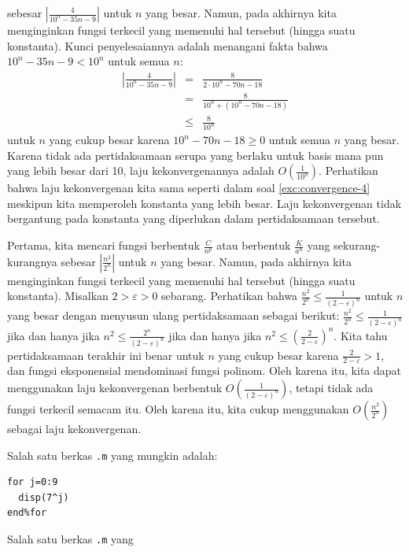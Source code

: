 \begin{description}
sebesar $\left|\frac{4}{10^{n}-35n-9}\right|$ untuk $n$ yang besar.
Namun, pada akhirnya kita menginginkan fungsi terkecil yang memenuhi
hal tersebut (hingga suatu konstanta). Kunci penyelesaiannya adalah
menangani fakta bahwa $10^{n}-35n-9<10^{n}$ untuk semua $n$:
\begin{eqnarray*}
\left|\frac{4}{10^{n}-35n-9}\right| & = & \frac{8}{2\cdot10^{n}-70n-18}\\
 & = & \frac{8}{10^{n}+(10^{n}-70n-18)}\\
 & \leq & \frac{8}{10^{n}}
\end{eqnarray*}
untuk $n$ yang cukup besar karena $10^{n}-70n-18\geq0$ untuk semua
$n$ yang besar. Karena tidak ada pertidaksamaan serupa yang berlaku
untuk basis mana pun yang lebih besar dari 10, laju kekonvergenannya
adalah $O\left(\frac{1}{10^{n}}\right)$. Perhatikan bahwa laju kekonvergenan
kita sama seperti dalam soal \ref{exc:convergence-4} meskipun kita
memperoleh konstanta yang lebih besar. Laju kekonvergenan tidak bergantung
pada konstanta yang diperlukan dalam pertidaksamaan tersebut.
\item [{\ref{exc:convergence-8}:}] Pertama, kita mencari fungsi berbentuk
$\frac{C}{n^{p}}$ atau berbentuk $\frac{K}{a^{n}}$ yang sekurang-kurangnya
sebesar $\left|\frac{n^{2}}{2^{n}}\right|$ untuk $n$ yang besar.
Namun, pada akhirnya kita menginginkan fungsi terkecil yang memenuhi
hal tersebut (hingga suatu konstanta). Misalkan $2>\varepsilon>0$
sebarang. Perhatikan bahwa $\frac{n^{2}}{2^{n}}\leq\frac{1}{(2-\varepsilon)^{n}}$
untuk $n$ yang besar dengan menyusun ulang pertidaksamaan sebagai
berikut: $\frac{n^{2}}{2^{n}}\leq\frac{1}{(2-\varepsilon)^{n}}$ jika
dan hanya jika $n^{2}\leq\frac{2^{n}}{(2-\varepsilon)^{n}}$ jika
dan hanya jika $n^{2}\leq\left(\frac{2}{2-\varepsilon}\right)^{n}$.
Kita tahu pertidaksamaan terakhir ini benar untuk $n$ yang cukup
besar karena $\frac{2}{2-\varepsilon}>1$, dan fungsi eksponensial
mendominasi fungsi polinom. Oleh karena itu, kita dapat menggunakan
laju kekonvergenan berbentuk $O\left(\frac{1}{(2-\varepsilon)^{n}}\right)$,
tetapi tidak ada fungsi terkecil semacam itu. Oleh karena itu, kita
cukup menggunakan $O\left(\frac{n^{2}}{2^{n}}\right)$ sebagai laju
kekonvergenan.
\item [{\ref{exc:convergence-10}:}] Salah satu berkas \texttt{.m} yang
mungkin adalah: \begin{verbatim}
for j=0:9
  disp(7^j)
end%for 
\end{verbatim}
\item [{\ref{exc:convergence-11}:}] Salah satu berkas \texttt{.m} yang

\end{description}
